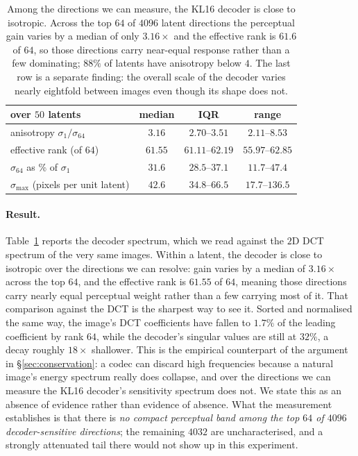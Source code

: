 \documentclass[10pt]{article}
\newcommand{\best}[1]{\bm{#1}}
\begin{document}
\begin{table}[t]
\centering
\small
\begin{tabular}{lccc}
\toprule
over $50$ latents & median & IQR & range \\
\midrule
anisotropy $\sigma_1/\sigma_{64}$ & $\best{3.16}$ & $2.70$--$3.51$ & $2.11$--$8.53$ \\
effective rank (of $64$) & $\best{61.55}$ & $61.11$--$62.19$ & $55.97$--$62.85$ \\
$\sigma_{64}$ as \% of $\sigma_1$ & $31.6$ & $28.5$--$37.1$ & $11.7$--$47.4$ \\
$\sigma_{\max}$ (pixels per unit latent) & $42.6$ & $34.8$--$66.5$ & $17.7$--$136.5$ \\
\bottomrule
\end{tabular}
\caption{Among the directions we can measure, the KL16 decoder is close to isotropic. Across the top
$64$ of $4096$ latent directions the perceptual gain varies by a median of only $3.16\times$ and the
effective rank is $61.6$ of $64$, so those directions carry near-equal response rather than a few
dominating; $88\%$ of latents have anisotropy below $4$. The last row is a separate finding: the
overall scale of the decoder varies nearly eightfold between images even though its shape does not.}
\label{tab:kl16}
\end{table}

\paragraph{Result.} Table~\ref{tab:kl16} reports the decoder spectrum, which we read against the $2$D
DCT spectrum of the very same images. Within a latent, the decoder is close to isotropic
over the directions we can resolve: gain varies by a median of $3.16\times$ across the top $64$, and
the effective rank is $61.55$ of $64$, meaning those directions carry nearly equal perceptual weight
rather than a few carrying most of it. That comparison against the DCT is the sharpest way
to see it. Sorted and normalised the same way, the image's DCT coefficients have fallen to $1.7\%$ of
the leading coefficient by rank $64$, while the decoder's singular values are still at $32\%$, a
decay roughly $18\times$ shallower. This is the empirical counterpart of the argument in
\S\ref{sec:conservation}: a codec can discard high frequencies because a natural image's energy
spectrum really does collapse, and over the directions we can measure the KL16 decoder's sensitivity
spectrum does not. We state this as an absence of evidence rather than evidence of absence. What the
measurement establishes is that there is \emph{no compact perceptual band among the top $64$ of
$4096$ decoder-sensitive directions}; the remaining $4032$ are uncharacterised, and a strongly
attenuated tail there would not show up in this experiment.
\end{document}
